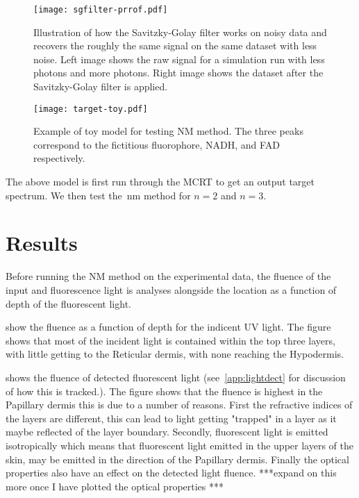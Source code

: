 \begin{figure}[!htbp]
  \centering
  \texttt{[image: sgfilter-prrof.pdf]}
  \caption{Illustration of how the Savitzky-Golay filter works on noisy data and recovers the roughly the same signal on the same dataset with less noise. Left image shows the raw signal for a simulation run with less photons and more photons. Right image shows the dataset after the Savitzky-Golay filter is applied.}
  \label{fig:sgfilter}
\end{figure}

\begin{figure}[!htbp]
	\centering
	\texttt{[image: target-toy.pdf]}
	\caption{Example of toy model for testing NM method. The three peaks correspond to the fictitious fluorophore, NADH, and FAD respectively.}
	\label{fig:figure1}
\end{figure}



The above model is first run through the MCRT to get an output target spectrum.
We then test the~\gls*{nm} method for $n=2$ and $n=3$.




\section{Results}

Before running the NM method on the experimental data, the fluence of the input and fluorescence light is analyses alongside the location as a function of depth of the fluorescent light.

 show the fluence as a function of depth for the indicent UV light.
The figure shows that most of the incident light is contained within the top three layers, with little getting to the Reticular dermis, with none reaching the Hypodermis.

 shows the fluence of detected fluorescent light (see~\cref{app:lightdect} for discussion of how this is tracked.).
The figure shows that the fluence is highest in the Papillary dermis this is due to a number of reasons.
First the refractive indices of the layers are different, this can lead to light getting "trapped" in a layer as it maybe reflected of the layer boundary.
Secondly, fluorescent light is emitted isotropically which means that fluorescent light emitted in the upper layers of the skin, may be emitted in the direction of the Papillary dermis.
Finally the optical properties also have an effect on the detected light fluence.
***expand on this more once I have plotted the optical properties ***

